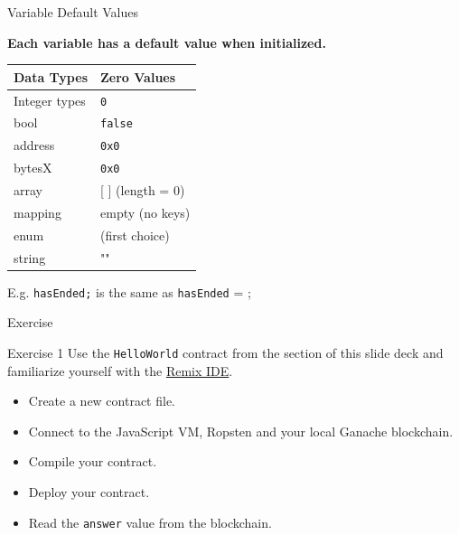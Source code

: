 \documentclass[handout]{beamer}
\begin{document}
\begin{frame}{Variable Default Values}

\textbf{Each variable has a default value when initialized.} \\

	\begin{table}
		\begin{tabular}{m{4cm} m{4cm}}
		\rowcolor{highlight}
			\hline
			Data Types & Zero Values\\
			\hline 
			\rowcolor{brightanthracite}
			Integer types & \texttt{0} \\
			bool &  \texttt{false} \\
			\rowcolor{brightanthracite}
			address & \texttt{0x0} \\
			bytesX & \texttt{0x0} \\
			\rowcolor{brightanthracite}
			array & [ ] (length = 0) \\
			mapping & empty (no keys) \\
			\rowcolor{brightanthracite}
			enum & (first choice) \\
			string & "" \\
			\hline
		\end{tabular}
	\end{table}	
	
	E.g. \texttt{hasEnded;} is the same as \texttt{hasEnded} = ;
	
\end{frame}

\begin{frame}{Exercise}
	\begin{exercise}{Exercise 1}
	Use the \texttt{HelloWorld} contract from the  section of this slide deck and familiarize yourself with the \link \href{https://remix.ethereum.org}{Remix IDE}.
	\begin{itemize}
		\item Create a new contract file.
		\item Connect to the JavaScript VM, Ropsten and your local Ganache blockchain.
		\item Compile your contract.
		\item Deploy your contract.
		\item Read the \texttt{answer}  value from the blockchain.
	\end{itemize}  
	\end{exercise}
\end{frame}
\end{document}
